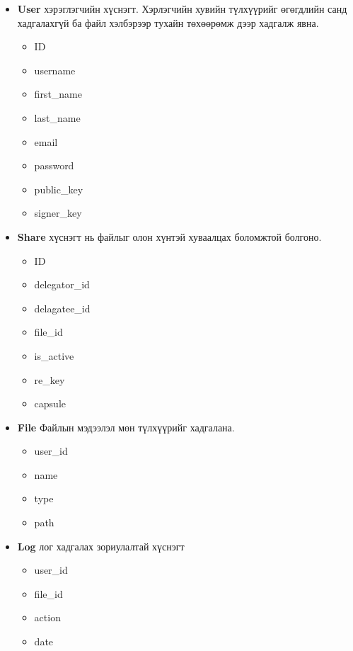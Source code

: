 \begin{itemize}
    \item \textbf{User} хэрэглэгчийн хүснэгт. Хэрлэгчийн хувийн түлхүүрийг өгөгдлийн санд хадгалахгүй ба файл хэлбэрээр тухайн төхөөрөмж дээр хадгалж явна. 
    \begin{itemize}
        \item ID
        \item username
        \item first\_name
        \item last\_name
        \item email
        \item password
        \item public\_key
        \item signer\_key
    \end{itemize}
    \item \textbf{Share} хүснэгт нь файлыг олон хүнтэй хуваалцах боломжтой болгоно.
    \begin{itemize}
        \item ID
        \item delegator\_id
        \item delagatee\_id
        \item file\_id
        \item is\_active
        \item re\_key
        \item capsule
    \end{itemize}
    \item \textbf{File} Файлын мэдээлэл мөн түлхүүрийг хадгалана.
    \begin{itemize}
        \item user\_id
        \item name
        \item type
        \item path
    \end{itemize}
    \item \textbf{Log} лог хадгалах зориулалтай хүснэгт
    \begin{itemize}
        \item user\_id
        \item file\_id
        \item action
        \item date
    \end{itemize}
\end{itemize}
